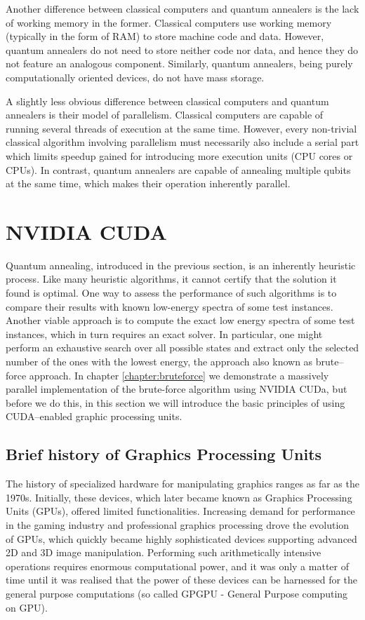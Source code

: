 Another difference between classical computers and quantum annealers is the lack of working memory in the former. Classical computers use working memory (typically in the form of RAM) to store machine code and data. However, quantum annealers do not need to store neither code nor data, and hence they do not feature an analogous component. Similarly, quantum annealers, being purely computationally oriented devices, do not have mass storage.

A slightly less obvious difference between classical computers and quantum annealers is their model
of parallelism. Classical computers are capable of running several threads of execution at the same
time. However, every non-trivial classical algorithm involving parallelism must necessarily also
include a serial part which limits speedup gained for introducing more execution units (CPU cores or
CPUs). In contrast, quantum annealers are capable of annealing multiple qubits at the same time,
which makes their operation inherently parallel.

\section{NVIDIA CUDA}

Quantum annealing, introduced in the previous section, is an inherently heuristic process. Like many
heuristic algorithms, it cannot certify that the solution it found is optimal. One way to assess the
performance of such algorithms is to compare their results with known low-energy spectra of some
test instances. Another viable approach is to compute the exact low energy spectra of some test
instances, which in turn requires an exact solver. In particular, one might perform an exhaustive
search over all possible states and extract only the selected number of the ones with the lowest
energy, the approach also known as brute--force approach. In chapter \ref{chapter:bruteforce} we
demonstrate a massively parallel implementation of the brute-force algorithm using NVIDIA CUDa, but
before we do this, in this section we will introduce the basic principles of using CUDA--enabled
graphic processing units.

\subsection{Brief history of Graphics Processing Units}
The history of specialized hardware for manipulating graphics ranges as far as the 1970s. Initially,
these devices, which later became known as Graphics Processing Units (GPUs), offered limited
functionalities. Increasing demand for performance in the gaming industry and professional graphics
processing drove the evolution of GPUs, which quickly became highly sophisticated devices supporting
advanced 2D and 3D image manipulation. Performing such arithmetically intensive operations requires
enormous computational power, and it was only a matter of time until it was realised that the
power of these devices can be harnessed for the general purpose computations (so called GPGPU -
General Purpose computing on GPU).

